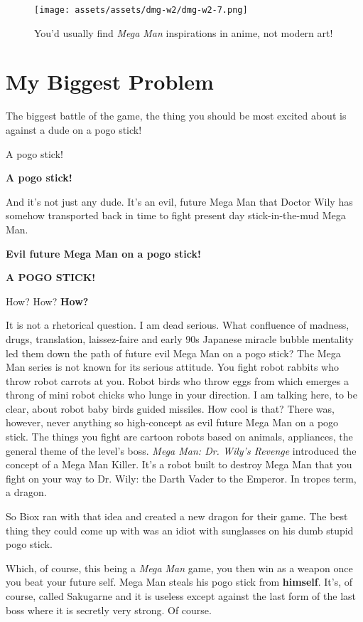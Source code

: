 \documentclass{book}
\begin{document}
\begin{figure}[hbt]
\vskip 10pt
\centering \texttt{[image: assets/assets/dmg-w2/dmg-w2-7.png]}\par\pagetwodescription You’d usually find \emph{Mega Man} inspirations in anime, not modern art!
\vskip 6pt
\end{figure}

\FloatBarrier\needspace{10mm}\section*{My Biggest Problem}\nopagebreak[4]

The biggest battle of the game, the thing you should be most excited about is against a dude on a pogo stick!

A pogo stick!

\textbf{A pogo stick!}

And it’s not just any dude. It’s an evil, future Mega Man that Doctor Wily has somehow transported back in time to fight present day stick-in-the-mud Mega Man.

\textbf{Evil future Mega Man on a pogo stick!}

\textbf{A POGO STICK!}

How? How? \textbf{How?}

It is not a rhetorical question. I am dead serious. What confluence of madness, drugs, translation, laissez-faire and early 90s Japanese miracle bubble mentality led them down the path of future evil Mega Man on a pogo stick? The Mega Man series is not known for its serious attitude. You fight robot rabbits who throw robot carrots at you. Robot birds who throw eggs from which emerges a throng of mini robot chicks who lunge in your direction. I am talking here, to be clear, about robot baby birds guided missiles. How cool is that? There was, however, never anything so high-concept as evil future Mega Man on a pogo stick. The things you fight are cartoon robots based on animals, appliances, the general theme of the level’s boss. \emph{Mega Man: Dr. Wily’s Revenge} introduced the concept of a Mega Man Killer. It’s a robot built to destroy Mega Man that you fight on your way to Dr. Wily: the Darth Vader to the Emperor. In tropes term, a dragon.

So Biox ran with that idea and created a new dragon for their game. The best thing they could come up with was an idiot with sunglasses on his dumb stupid pogo stick.

Which, of course, this being a \emph{Mega Man} game, you then win as a weapon once you beat your future self. Mega Man steals his pogo stick from \textbf{himself}. It’s, of course, called Sakugarne and it is useless except against the last form of the last boss where it is secretly very strong. Of course.
\end{document}
